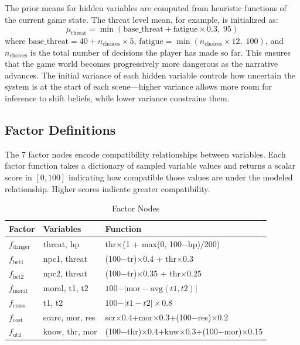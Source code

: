 \documentclass[journal]{IEEEtran}
\begin{document}
The prior means for hidden variables are computed from heuristic functions of the current game state. The threat level mean, for example, is initialized as:
\begin{equation}
\mu_{\text{threat}} = \min(\text{base\_threat} + \text{fatigue} \times 0.3,\; 95)
\end{equation}
where $\text{base\_threat} = 40 + n_{\text{choices}} \times 5$, $\text{fatigue} = \min(n_{\text{choices}} \times 12,\; 100)$, and $n_{\text{choices}}$ is the total number of decisions the player has made so far. This ensures that the game world becomes progressively more dangerous as the narrative advances. The initial variance of each hidden variable controls how uncertain the system is at the start of each scene---higher variance allows more room for inference to shift beliefs, while lower variance constrains them.

\subsection{Factor Definitions}

The 7 factor nodes encode compatibility relationships between variables. Each factor function takes a dictionary of sampled variable values and returns a scalar score in $[0, 100]$ indicating how compatible those values are under the modeled relationship. Higher scores indicate greater compatibility.

\begin{table}[!ht]
\centering
\caption{Factor Nodes}
\label{tab:factors}
\small
\setlength{\tabcolsep}{3pt}
\begin{tabular}{|l|l|l|}
\hline
\textbf{Factor} & \textbf{Variables} & \textbf{Function} \\
\hline
$f_{\text{danger}}$ & threat, hp & thr$\times$(1 + max(0, 100$-$hp)/200) \\
\hline
$f_{\text{bet1}}$ & npc1, threat & (100$-$tr)$\times$0.4 + thr$\times$0.3 \\
\hline
$f_{\text{bet2}}$ & npc2, threat & (100$-$tr)$\times$0.35 + thr$\times$0.25 \\
\hline
$f_{\text{moral}}$ & moral, t1, t2 & $100 - \vert \text{mor} - \text{avg}(t1,t2) \vert$ \\
\hline
$f_{\text{cross}}$ & t1, t2 & $100 - \vert t1 - t2 \vert \times 0.8$ \\
\hline
$f_{\text{cost}}$ & scarc, mor, res & scr$\times$0.4+mor$\times$0.3+(100$-$res)$\times$0.2 \\
\hline
$f_{\text{util}}$ & know, thr, mor & (100$-$thr)$\times$0.4+knw$\times$0.3+(100$-$mor)$\times$0.15 \\
\hline
\end{tabular}
\vspace{-4pt}
\end{table}
\end{document}
